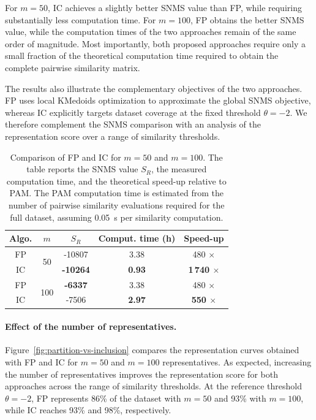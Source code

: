 \documentclass{ieeeaccess}
\newcommand{\threshold}{\theta}
\newcommand{\kmedoidsalg}{KMedoids\xspace}
\newcommand{\partitioning}{FP\xspace}
\newcommand{\inclusion}{IC\xspace}
\begin{document}
For $m=50$, \inclusion achieves a slightly better SNMS value than \partitioning, while requiring substantially less computation time. For $m=100$, \partitioning obtains the better SNMS value, while the computation times of the two approaches remain of the same order of magnitude. Most importantly, both proposed approaches require only a small fraction of the theoretical computation time required to obtain the complete pairwise similarity matrix.

The results also illustrate the complementary objectives of the two approaches. \partitioning uses local \kmedoidsalg optimization to approximate the global SNMS objective, whereas \inclusion explicitly targets dataset coverage at the fixed threshold $\threshold=-2$. We therefore complement the SNMS comparison with an analysis of the representation score over a range of similarity thresholds.

\begin{table}[htbp]
    \centering \normalsize
    \begin{tabular}{|c|c|c|c|c|}
     \hline
     {Algo.} & $m$ & $S_R$ &
     {Comput. time (h)} &
     {Speed-up} \\
     \hline
     \partitioning & \multirow{2}{*}{50} & -10807 & 3.38 & 480 $\times$ \\
     {\inclusion} &  & \textbf{-10264} &
     \textbf{0.93} & \textbf{1\,740 $\times$} \\
     \hline
     \partitioning & \multirow{2}{*}{100} & \textbf{-6337} & 3.38 &
     480 $\times$ \\
     {\inclusion} &  & -7506 &
     \textbf{2.97} & \textbf{550 $\times$} \\
     \hline
    \end{tabular}
    \caption{Comparison of \partitioning and \inclusion for $m=50$ and $m=100$. The table reports the SNMS value $S_R$, the measured computation time, and the theoretical speed-up relative to PAM. The PAM computation time is estimated from the number of pairwise similarity evaluations required for the full dataset, assuming 0.05~s per similarity computation.}
    \label{tab:global-comparison}
\end{table}

\paragraph*{Effect of the number of representatives.}

Figure~\ref{fig:partition-vs-inclusion} compares the representation curves obtained with \partitioning and \inclusion for $m=50$ and $m=100$ representatives. As expected, increasing the number of representatives improves the representation score for both approaches across the range of similarity thresholds. At the reference threshold $\threshold=-2$, \partitioning represents 86\% of the dataset with $m=50$ and 93\% with $m=100$, while \inclusion reaches 93\% and 98\%, respectively.
\end{document}
